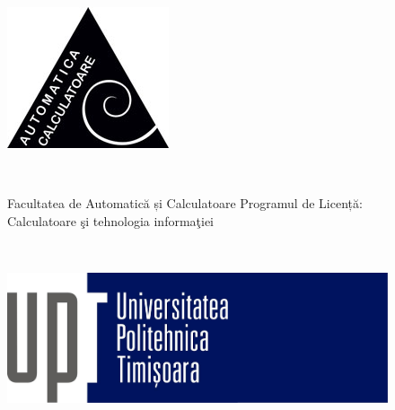 \documentclass[11pt]{report}
\begin{document}
\begin{titlepage}
\begin{center}

    \begin{figure}[!htb]
        \begin{minipage}{0.16\textwidth}
            \includegraphics[width=\linewidth]{images/logo_ac.jpg}
        \end{minipage}\

        \begin{minipage}{0.5\textwidth}
            Facultatea de Automatică și Calculatoare \newline
            Programul de Licență: \newline
            Calculatoare şi tehnologia informaţiei
        \end{minipage}\

        \begin{minipage}{0.3\textwidth}
            \includegraphics[width=\linewidth]{images/logo_upt.jpg}
        \end{minipage}
    \end{figure}


\end{center}
\end{titlepage}
\end{document}
